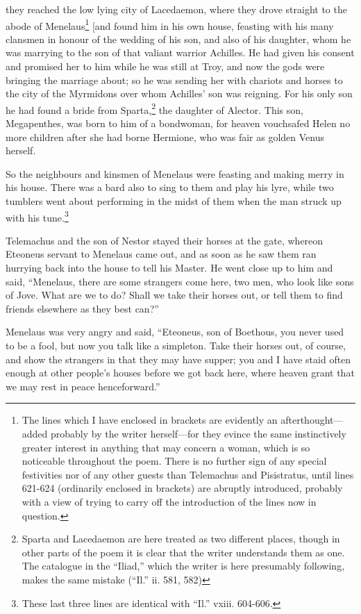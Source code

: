 they reached the low lying city of Lacedaemon, where they drove straight to the
abode of Menelaus\footnote{The lines which I have enclosed in brackets are evidently an
afterthought—added probably by the writer herself—for they evince the same
instinctively greater interest in anything that may concern a woman, which is
so noticeable throughout the poem. There is no further sign of any special
festivities nor of any other guests than Telemachus and Pisistratus, until
lines 621-624 (ordinarily enclosed in brackets) are abruptly introduced,
probably with a view of trying to carry off the introduction of the lines now
in question.} [and found him in his own house,
feasting with his many clansmen in honour of the wedding of his son, and also
of his daughter, whom he was marrying to the son of that valiant warrior
Achilles. He had given his consent and promised her to him while he was still
at Troy, and now the gods were bringing the marriage about; so he was sending
her with chariots and horses to the city of the Myrmidons over whom Achilles’
son was reigning. For his only son he had found a bride from Sparta,\footnote{Sparta and Lacedaemon are here treated as two different places, though in
other parts of the poem it is clear that the writer understands them as one.
The catalogue in the “Iliad,” which the writer is here presumably following,
makes the same mistake (“Il.” ii. 581, 582)} the daughter of
Alector. This son, Megapenthes, was born to him of a bondwoman, for heaven
vouchsafed Helen no more children after she had borne Hermione, who was fair as
golden Venus herself.

So the neighbours and kinsmen of Menelaus were feasting and making merry in his
house. There was a bard also to sing to them and play his lyre, while two
tumblers went about performing in the midst of them when the man struck up with
his tune.\footnote{These last three lines are identical with “Il.” vxiii. 604-606.}

Telemachus and the son of Nestor stayed their horses at the gate, whereon
Eteoneus servant to Menelaus came out, and as soon as he saw them ran hurrying
back into the house to tell his Master. He went close up to him and said,
“Menelaus, there are some strangers come here, two men, who look like sons of
Jove. What are we to do? Shall we take their horses out, or tell them to find
friends elsewhere as they best can?”

Menelaus was very angry and said, “Eteoneus, son of Boethous, you never used to
be a fool, but now you talk like a simpleton. Take their horses out, of course,
and show the strangers in that they may have supper; you and I have staid often
enough at other people’s houses before we got back here, where heaven grant
that we may rest in peace henceforward.”

